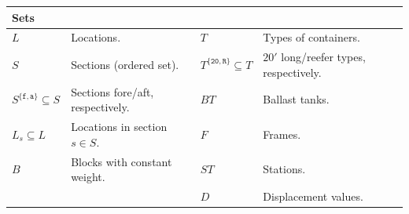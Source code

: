 \documentclass[citeauthoryear]{llncs}
\newcommand{\trt}[1]{\texttt{#1}}
\newcommand{\mi}{\mathit}
\begin{document}
\vspace{3mm}
\begin{centering}
\begin{tabular}{p{2.6cm}p{4.8cm}|p{2.4cm}p{4.8cm}}
\multicolumn{2}{l}{\textbf{Sets}}\\
\hline\noalign{\smallskip}
$L$  																	& Locations. 												& $T$	 																	& Types of containers.\\ 
$S$	 																	& Sections (ordered set).						& $T^{\{\trt{20},\trt{R}\}}\subseteq T$ & $20'$ long/reefer types, respectively. \\
$S^{\{\trt{f}, \trt{a}\}}\subseteq S$ & Sections fore/aft, respectively. 	& $\mi{BT}$ 														& Ballast tanks. \\
$L_s\subseteq L$ 											& Locations in section $s\in S$. 		& $F$	 																	& Frames.\\
$B$ 																	& Blocks with constant weight. 			& $\mi{ST}$ 														& Stations.\\
																			&																		& $D$																		& Displacement values.\\
\end{tabular}
\end{centering}
\end{document}
